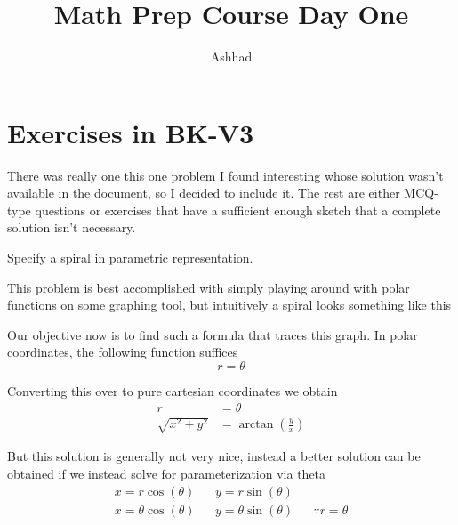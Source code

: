 \documentclass[a4paper]{article}
\title{Math Prep Course Day One}
\author{Ashhad}
\begin{document}
\maketitle

\section{Exercises in BK-V3}
There was really one this one problem I found interesting whose solution wasn't available in the document, so I decided to include it. The rest are either MCQ-type questions or exercises that have a sufficient enough sketch that a complete solution isn't necessary.

\begin{question}{}{}
Specify a spiral in parametric representation.
\end{question}

This problem is best accomplished with simply playing around with polar functions on some graphing tool, but intuitively a spiral looks something like this

\begin{center}
\end{center}


Our objective now is to find such a formula that traces this graph. In polar coordinates, the following function suffices
\[
r = \theta
\]

Converting this over to pure cartesian coordinates we obtain
\begin{align*}
r &= \theta \\
\sqrt{x^2 +y^2} &= \arctan\left(\frac{y}{x}\right)
\end{align*}

But this solution is generally not very nice, instead a better solution can be obtained if we instead solve for parameterization via theta
\begin{align*}
x = r\cos(\theta) && y = r\sin(\theta) \\
x = \theta\cos(\theta) && y = \theta\sin(\theta) && \because r = \theta
\end{align*}
\end{document}
